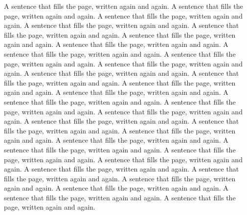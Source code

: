 \documentclass{article}
\begin{document}
A sentence that fills the page, written again and again. A sentence that fills the page, written again
and again. A sentence that fills the page, written again and again. A sentence that fills the page, written
again and again. A sentence that fills the page, written again and again. A sentence that fills the page,
written again and again. A sentence that fills the page, written again and again. A sentence that fills
the page, written again and again. A sentence that fills the page, written again and again. A sentence
that fills the page, written again and again. A sentence that fills the page, written again and again.
A sentence that fills the page, written again and again. A sentence that fills the page, written again
and again. A sentence that fills the page, written again and again. A sentence that fills the page, written
again and again. A sentence that fills the page, written again and again. A sentence that fills the page,
written again and again. A sentence that fills the page, written again and again. A sentence that fills
the page, written again and again. A sentence that fills the page, written again and again. A sentence
that fills the page, written again and again. A sentence that fills the page, written again and again.
A sentence that fills the page, written again and again. A sentence that fills the page, written again
and again. A sentence that fills the page, written again and again. A sentence that fills the page, written
again and again. A sentence that fills the page, written again and again. A sentence that fills the page,
written again and again. A sentence that fills the page, written again and again. A sentence that fills
the page, written again and again.

\end{document}
